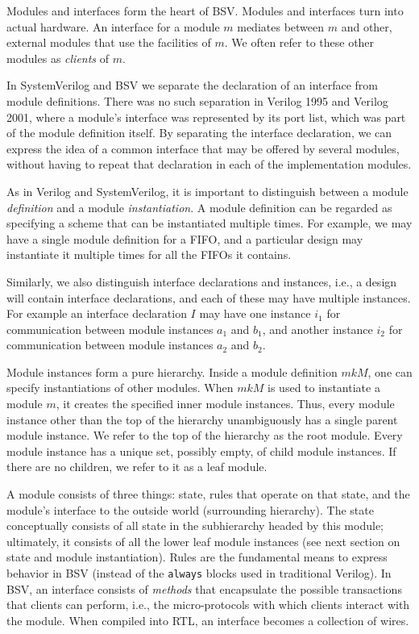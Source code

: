 \documentclass[twoside,letterpaper]{article}
\newcommand{\BSV}{BSV}
\newcommand{\SV}{SystemVerilog}
\newcommand{\V}{Verilog}
\newcommand{\VOrig}{Verilog 1995}
\newcommand{\VTwoK}{Verilog 2001}
\begin{document}
Modules and interfaces form the heart of {\BSV}.  Modules and
interfaces turn into actual hardware.  An interface for a module $m$
mediates between $m$ and other, external modules that use the
facilities of $m$.  We often refer to these other modules as
\emph{clients} of $m$.

In {\SV} and {\BSV} we separate the declaration of an interface from
module definitions.  There was no such separation in {\VOrig} and
{\VTwoK}, where a module's interface was represented by its port list,
which was part of the module definition itself.  By separating the
interface declaration, we can express the idea of a common interface
that may be offered by several modules, without having to repeat that
declaration in each of the implementation modules.

As in {\V} and {\SV}, it is important to distinguish between a module
\emph{definition} and a module \emph{instantiation}.  A module
definition can be regarded as specifying a scheme that can be
instantiated multiple times.  For example, we may have a single module
definition for a FIFO, and a particular design may instantiate it
multiple times for all the FIFOs it contains.

Similarly, we also distinguish interface declarations and instances,
i.e., a design will contain interface declarations, and each of these
may have multiple instances.  For example an interface declaration $I$
may have one instance $i_1$ for communication between module instances
$a_1$ and $b_1$, and another instance $i_2$ for communication between
module instances $a_2$ and $b_2$.

Module instances form a pure hierarchy.  Inside a module definition
$mkM$, one can specify instantiations of other modules.  When $mkM$ is
used to instantiate a module $m$, it creates the specified inner
module instances.  Thus, every module instance other than the top of
the hierarchy unambiguously has a single parent module instance.  We
refer to the top of the hierarchy as the root module.  Every module
instance has a unique set, possibly empty, of child module instances.
If there are no children, we refer to it as a leaf module.

A module consists of three things: state, rules that operate on that
state, and the module's interface to the outside world (surrounding
hierarchy).  The state conceptually consists of all state in the
subhierarchy headed by this module; ultimately, it consists of all
the lower leaf module instances (see next section on state and module
instantiation).  Rules are the fundamental means to express behavior
in {\BSV} (instead of the \texttt{always} blocks used in traditional
{\V}).  In {\BSV}, an interface consists of \emph{methods} that
encapsulate the possible transactions that clients can perform, i.e.,
the micro-protocols with which clients interact with the module.  When
compiled into RTL, an interface becomes a collection of wires.
\end{document}
